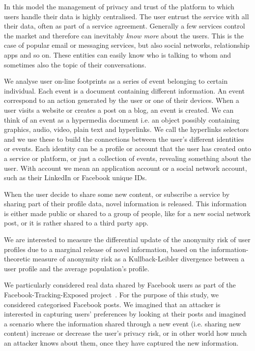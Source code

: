 In this model the management of privacy and trust of the platform to which users handle their data is highly centralised. The user entrust the service with all their data, often as part of a service agreement. Generally a few services control the market and therefore can inevitably \emph{know more} about the users. This is the case of popular email or messaging services, but also social networks, relationship apps and so on. These entities can easily know who is talking to whom and sometimes also the topic of their conversations.

We analyse user on-line footprints as a series of event belonging to certain individual. Each event is a document containing different information. An event correspond to an action generated by the user or one of their devices. When a user visits a website or creates a post on a blog, an event is created. We can think of an event as a hypermedia document i.e. an object possibly containing graphics, audio, video, plain text and hyperlinks. We call the hyperlinks selectors and we use these to build the connections between the user's different identities or events. Each identity can be a profile or account that the user has created onto a service or platform, or just a collection of events, revealing something about the user. With account we mean an application account or a social network account, such as their LinkedIn or Facebook unique IDs. 

When the user decide to share some new content, or subscribe a service by sharing part of their profile data, novel information is released. This information is either made public or shared to a group of people, like for a new social network post, or it is rather shared to a third party app.

We are interested to measure the differential update of the anonymity risk of user profiles due to a marginal release of novel information, based on the information-theoretic measure of anonymity risk as a Kullback-Leibler divergence between a user profile and the average population's profile.

We particularly considered real data shared by Facebook users as part of the Facebook-Tracking-Exposed project~\cite{FTE}. For the purpose of this study, we considered categorised Facebook posts. We imagined that an attacker is interested in capturing users' preferences by looking at their posts and imagined a scenario where the information shared through a new event (i.e.  sharing new content) increase or decrease the user's privacy risk, or in other world how much an attacker knows about them, once they have captured the new information.

